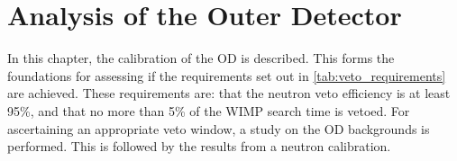 \chapter{Analysis of the Outer Detector} \label{chap:analysis_of_the_od}

\par
In this chapter, the calibration of the OD is described.
This forms the foundations for assessing if the requirements set out in \autoref{tab:veto_requirements} are achieved.
These requirements are: that the neutron veto efficiency is at least 95\%, and that no more than 5\% of the WIMP search time is vetoed.
For ascertaining an appropriate veto window, a study on the OD backgrounds is performed. 
This is followed by the results from a neutron calibration.


%



%

%

%